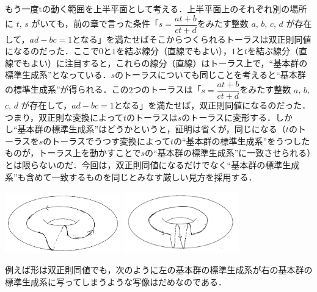 もう一度tの動く範囲を上半平面として考える．上半平面上のそれぞれ別の場所に $t$, $s$ がいても，前の章で言った条件「$s=\dfrac {at+b} {ct+d}$をみたす整数 $a$, $b$, $c$, $d$ が存在して，$ad-bc=1$となる」を満たせばそこからつくられるトーラスは双正則同値になるのだった．ここで$0$と$1$を結ぶ線分（直線でもよい），$1$と$t$を結ぶ線分（直線でもよい）に注目すると，これらの線分（直線）はトーラス上で，``基本群の標準生成系''となっている．$s$のトーラスについても同じことを考えると``基本群の標準生成系''が得られる．この$2$つのトーラスは「$s=\dfrac {at+b} {ct+d}$をみたす整数 $a$, $b$, $c$, $d$ が存在して，$ad-bc=1$となる」を満たせば，双正則同値になるのだった．つまり，双正則な変換によって$t$のトーラスは$s$のトーラスに変形する．しかし``基本群の標準生成系''はどうかというと，証明は省くが，同じになる（$t$のトーラスを$s$のトーラスでうつす変換によって$t$の``基本群の標準生成系''をうつしたものが，トーラス上を動かすことで$s$の``基本群の標準生成系''に一致させられる）とは限らないのだ．今回は，双正則同値になるだけでなく``基本群の標準生成系''も含めて一致するものを同じとみなす厳しい見方を採用する．
\begin{center}
\includegraphics[width=5cm]{asaka12.png}
\includegraphics[width=5cm]{asaka14.png}
\end{center}

例えば形は双正則同値でも，次のように左の基本群の標準生成系が右の基本群の標準生成系に写ってしまうような写像はだめなのである．

